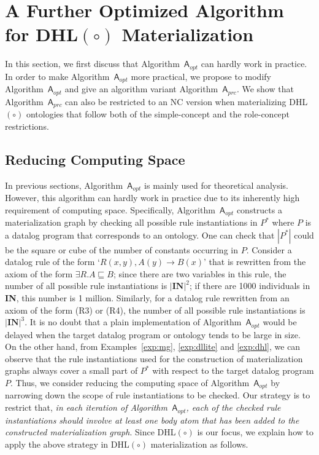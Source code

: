 \section{A Further Optimized Algorithm for DHL$(\circ)$ Materialization}
\label{sec:practicalAlg}

In this section, we first discuss that Algorithm~$\mathsf{A}_{opt}$ can hardly work in practice.
In order to make Algorithm~$\mathsf{A}_{opt}$ more practical,
we propose to modify Algorithm~$\mathsf{A}_{opt}$ and give an algorithm variant Algorithm~$\mathsf{A}_{prc}$.
We show that Algorithm~$\mathsf{A}_{prc}$ can also be restricted to an NC version
when materializing DHL$(\circ)$ ontologies that follow both of the simple-concept
and the role-concept restrictions.

\subsection{Reducing Computing Space}

In previous sections, Algorithm~$\mathsf{A}_{opt}$ is mainly used for theoretical analysis.
However, this algorithm can hardly work in practice due to its inherently
high requirement of computing space. Specifically,
Algorithm~$\mathsf{A}_{opt}$ constructs a materialization graph by checking all possible rule
instantiations in $P^*$ where $P$ is a datalog program that corresponds to an ontology.
One can check that $|P^*|$ could be the square or cube of the number of constants occurring in $P$.
Consider a datalog rule of the form `$R(x,y),A(y)\rightarrow B(x)$'
that is rewritten from the axiom of the form $\exists R.A\sqsubseteq B$;
since there are two variables in this rule, the number of all possible rule instantiations
is $|\textbf{IN}|^2$; if there are
1000 individuals in \textbf{IN}, this number is 1 million.
Similarly, for a datalog rule rewritten from an axiom of the form (R3) or (R4),
the number of all possible rule instantiations is $|\textbf{IN}|^3$.
It is no doubt that a plain implementation of Algorithm~$\mathsf{A}_{opt}$ would be delayed
when the target datalog program or ontology
tends to be large in size.
On the other hand, from Examples~\ref{exp:mg}, \ref{exp:dllite} and \ref{exp:dhl},
we can observe that the rule instantiations used for the construction
of materialization graphs always cover a small part of $P^*$ with respect to the target datalog program $P$.
Thus, we consider reducing the computing space of Algorithm~$\mathsf{A}_{opt}$
by narrowing down the scope of rule instantiations to be checked.
Our strategy is to restrict that, \emph{in each iteration of Algorithm~$\mathsf{A}_{opt}$,
each of the checked rule instantiations should involve at least one body atom that has been
added to the constructed materialization graph}.
Since DHL$(\circ)$
is our focus, we explain how to apply the above strategy in DHL$(\circ)$ materialization
as follows.

